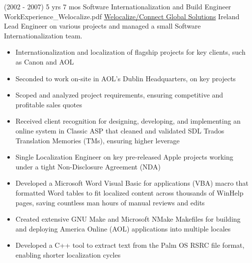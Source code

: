 \begin{twenty}
\twentyitem
  {(2002 - 2007) 5 yrs 7 mos}
  {Software Internationalization and Build Engineer}
  {WorkExperience_Welocalize.pdf}
  {\href{https://www.welocalize.com/}{Welocalize/Connect Global Solutions}}
  {Ireland}
  {Lead Engineer on various projects and managed a small Software Internationalization team.}
  {\begin{itemize}
    \item Internationalization and localization of flagship projects for key clients, such as Canon and AOL
    \item Seconded to work on-site in AOL’s Dublin Headquarters, on key projects
    \item Scoped and analyzed project requirements, ensuring competitive and profitable sales quotes
  \end{itemize}}
  {\begin{itemize}
    \item Received client recognition for designing, developing, and implementing an online system in Classic ASP that cleaned and validated SDL Trados Translation Memories (TMs), ensuring higher leverage
    \item Single Localization Engineer on key pre-released Apple projects working under a tight Non-Disclosure Agreement (NDA)
    \item Developed a Microsoft Word Visual Basic for applications (VBA) macro that formatted Word tables to fit localized content across thousands of WinHelp pages, saving countless man hours of manual reviews and edits
    \item Created extensive GNU Make and Microsoft NMake Makefiles for building and deploying America Online (AOL) applications into multiple locales
    \item Developed a C++ tool to extract text from the Palm OS RSRC file format, enabling shorter localization cycles
  \end{itemize}}
\end{twenty}

